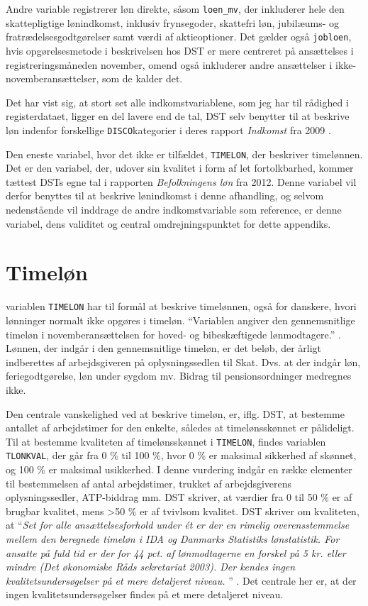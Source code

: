 Andre variable registrerer løn direkte, såsom \texttt{loen\_mv}, der inkluderer hele den skattepligtige lønindkomst, inklusiv frynsegoder, skattefri løn, jubilæums- og fratrædelsesgodtgørelser samt værdi af aktieoptioner. Det gælder også \texttt{jobloen}, hvis opgørelsesmetode i beskrivelsen hos DST er mere centreret på ansættelses i registreringsmåneden november, omend også inkluderer andre ansættelser i ikke-novemberansættelser, som de kalder det. \label{indkomstvariable}

Det har vist sig, at stort set alle indkomstvariablene, som jeg har til rådighed i registerdataet, ligger en del lavere end de tal, DST selv benytter til at beskrive løn indenfor forskellige \texttt{DISCO}kategorier i deres rapport \emph{Indkomst} fra 2009  \textcite{DST2009}.  

Den eneste variabel, hvor det ikke er tilfældet, \texttt{TIMELON}, der beskriver timelønnen. Det er den variabel, der, udover sin kvalitet i form af let fortolkbarhed, kommer tættest DSTs egne tal i rapporten \emph{Befolkningens løn} fra 2012. Denne variabel vil derfor benyttes til at beskrive lønindkomst i denne afhandling, og selvom nedenstående vil inddrage de andre indkomstvariable som reference, er denne variabel, dens validitet og central omdrejningspunktet for dette appendiks. 

\section{Timeløn \label{}}

variablen \texttt{TIMELON} har til formål at beskrive timelønnen, også for danskere, hvori lønninger normalt ikke opgøres i timeløn. “Variablen angiver den gennemsnitlige timeløn i novemberansættelsen for hoved- og bibeskæftigede lønmodtagere.” \parencite{DSTTIMELON}. Lønnen, der indgår i den gennemsnitlige timeløn, er det beløb, der årligt indberettes af arbejdsgiveren på oplysningssedlen til Skat. Dvs. at der indgår løn, feriegodtgørelse, løn under sygdom mv. Bidrag til pensionsordninger medregnes ikke. 

Den centrale vanskelighed ved at beskrive timeløn, er, iflg. DST, at bestemme antallet af arbejdstimer for den enkelte, således at timelønsskønnet er pålideligt. Til at bestemme kvaliteten af timelønsskønnet i \texttt{TIMELON}, findes variablen \texttt{TLONKVAL}, der går fra 0 \% til 100 \%, hvor 0 \% er maksimal sikkerhed af skønnet, og 100 \% er maksimal usikkerhed. I denne vurdering indgår en række elementer til bestemmelsen af antal arbejdstimer, trukket af arbejdsgiverens oplysningssedler, ATP-biddrag mm. DST skriver, at værdier fra 0 til 50 \% er af brugbar kvalitet, mens >50 \% er af tvivlsom kvalitet. DST skriver om kvaliteten, at “\emph{Set for alle ansættelsesforhold under ét er der en rimelig overensstemmelse mellem den beregnede timeløn i IDA og Danmarks Statistiks lønstatistik. For ansatte på fuld tid er der for 44 pct. af lønmodtagerne en forskel på 5 kr. eller mindre (Det økonomiske Råds sekretariat 2003). Der kendes ingen kvalitetsundersøgelser på et mere detaljeret niveau. }” \parencite{DSTTIMELON}. Det centrale her er, at der ingen kvalitetsundersøgelser findes på et mere detaljeret niveau. 

